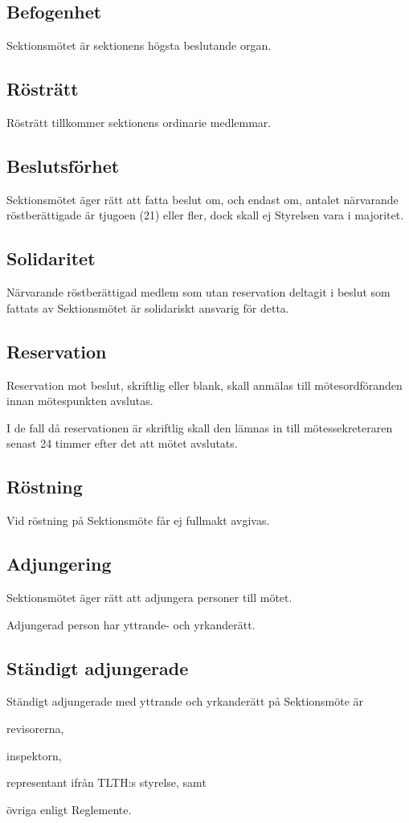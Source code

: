 \documentclass[10pt]{article}
\begin{document}
    \subsection{Befogenhet}
    Sektionsmötet är sektionens högsta beslutande organ.
    
    \subsection{Rösträtt}
    Rösträtt tillkommer sektionens ordinarie medlemmar.
    
    \subsection{Beslutsförhet}
    Sektionsmötet äger rätt att fatta beslut om, och endast om, antalet
    närvarande röstberättigade är tjugoen (21) eller fler, dock skall ej Styrelsen
    vara i majoritet.
    
    \subsection{Solidaritet}
    Närvarande röstberättigad medlem som utan reservation deltagit i beslut som
    fattats av Sektionsmötet är solidariskt ansvarig för detta.
    
    \subsection{Reservation}
    Reservation mot beslut, skriftlig eller blank, skall anmälas till
    mötesordföranden innan mötespunkten avslutas.
    
    I de fall då reservationen är skriftlig skall den lämnas in till
    mötessekreteraren senast 24 timmer efter det att mötet avslutats.
    
    \subsection{Röstning}
    Vid röstning på Sektionsmöte får ej fullmakt avgivas.
    
    \subsection{Adjungering}
    Sektionsmötet äger rätt att adjungera personer till mötet.
    
    Adjungerad person har yttrande- och yrkanderätt.
    
    \subsection{Ständigt adjungerade}
    Ständigt adjungerade med yttrande och yrkanderätt på
    Sektionsmöte är
    \begin{alphlist}
    \item 	revisorerna,
    \item 	inspektorn,
    \item 	representant ifrån TLTH:s styrelse, samt
    \item 	övriga enligt Reglemente.
    \end{alphlist}
    
\end{document}
